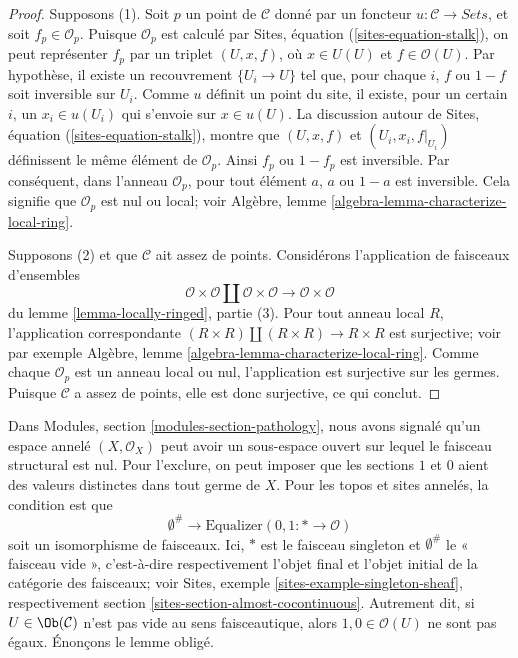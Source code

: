 \begin{proof}
Supposons (1). Soit $p$ un point de $\mathcal{C}$ donné par un foncteur
$u : \mathcal{C} \to \textit{Sets}$, et soit $f_p \in \mathcal{O}_p$.
Puisque $\mathcal{O}_p$ est calculé par Sites, équation
(\ref{sites-equation-stalk}), on peut représenter $f_p$ par un triplet
$(U, x, f)$, où $x \in U(U)$ et $f \in \mathcal{O}(U)$. Par hypothèse, il existe
un recouvrement $\{U_i \to U\}$ tel que, pour chaque $i$, $f$ ou $1 - f$ soit
inversible sur $U_i$. Comme $u$ définit un point du site, il existe, pour un
certain $i$, un $x_i \in u(U_i)$ qui s'envoie sur $x \in u(U)$. La discussion
autour de Sites, équation (\ref{sites-equation-stalk}), montre que $(U, x, f)$ et
$(U_i, x_i, f|_{U_i})$ définissent le même élément de $\mathcal{O}_p$. Ainsi
$f_p$ ou $1 - f_p$ est inversible. Par conséquent, dans l'anneau
$\mathcal{O}_p$, pour tout élément $a$, $a$ ou $1 - a$ est inversible. Cela
signifie que $\mathcal{O}_p$ est nul ou local; voir Algèbre,
lemme \ref{algebra-lemma-characterize-local-ring}.

\medskip\noindent
Supposons (2) et que $\mathcal{C}$ ait assez de points. Considérons
l'application de faisceaux d'ensembles
$$
\mathcal{O} \times \mathcal{O} \amalg \mathcal{O} \times \mathcal{O}
\longrightarrow
\mathcal{O} \times \mathcal{O}
$$
du lemme \ref{lemma-locally-ringed}, partie (3). Pour tout anneau local $R$,
l'application correspondante
$(R \times R) \amalg (R \times R) \to R \times R$
est surjective; voir par exemple Algèbre,
lemme \ref{algebra-lemma-characterize-local-ring}. Comme chaque
$\mathcal{O}_p$ est un anneau local ou nul, l'application est surjective sur
les germes. Puisque $\mathcal{C}$ a assez de points, elle est donc surjective,
ce qui conclut.
\end{proof}

\noindent
Dans Modules, section \ref{modules-section-pathology}, nous avons signalé
qu'un espace annelé $(X, \mathcal{O}_X)$ peut avoir un sous-espace ouvert sur
lequel le faisceau structural est nul. Pour l'exclure, on peut imposer que les
sections $1$ et $0$ aient des valeurs distinctes dans tout germe de $X$.
Pour les topos et sites annelés, la condition est que
\begin{equation}
\label{equation-one-is-never-zero}
\emptyset^\# \longrightarrow
\text{Equalizer}(0, 1 : * \longrightarrow \mathcal{O})
\end{equation}
soit un isomorphisme de faisceaux. Ici, $*$ est le faisceau singleton et
$\emptyset^\#$ le « faisceau vide », c'est-à-dire respectivement l'objet final
et l'objet initial de la catégorie des faisceaux; voir Sites,
exemple \ref{sites-example-singleton-sheaf}, respectivement
section \ref{sites-section-almost-cocontinuous}. Autrement dit, si
$U \in \Ob(\mathcal{C})$ n'est pas vide au sens faisceautique, alors
$1, 0 \in \mathcal{O}(U)$ ne sont pas égaux. Énonçons le lemme obligé.

